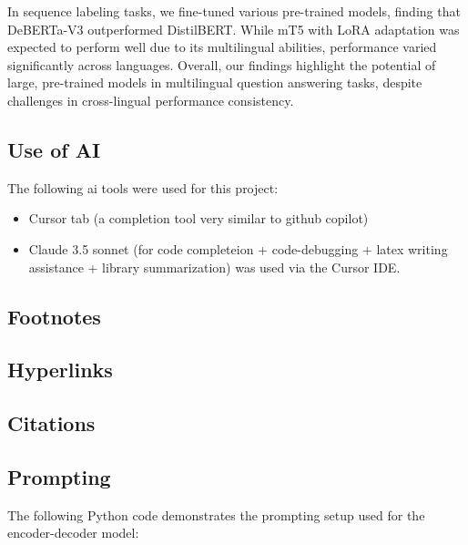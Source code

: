 \documentclass[11pt]{article}
\begin{document}
In sequence labeling tasks, we fine-tuned various pre-trained models, finding that DeBERTa-V3 outperformed DistilBERT. While mT5 with LoRA adaptation was expected to perform well due to its multilingual abilities, performance varied significantly across languages. Overall, our findings highlight the potential of large, pre-trained models in multilingual question answering tasks, despite challenges in cross-lingual performance consistency.

\subsection{Use of AI}
The following ai tools were used for this project:

\begin{itemize}
    \item Cursor tab (a completion tool very similar to github copilot)
    \item Claude 3.5 sonnet (for code completeion + code-debugging + latex writing assistance + library summarization) was used via the Cursor IDE.
\end{itemize}

\subsection{Footnotes}

\subsection{Hyperlinks}
\subsection{Citations}


\appendix


\subsection{Prompting}
\label{sec:prompting}
The following Python code demonstrates the prompting setup used for the encoder-decoder model:
\end{document}
